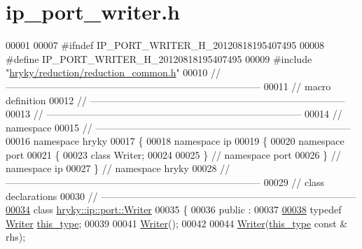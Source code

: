 \hypertarget{ip__port__writer_8h_source}{\section{ip\-\_\-port\-\_\-writer.\-h}
}

\begin{DoxyCode}
00001 
00007 \textcolor{preprocessor}{#ifndef IP\_PORT\_WRITER\_H\_20120818195407495}
00008 \textcolor{preprocessor}{}\textcolor{preprocessor}{#define IP\_PORT\_WRITER\_H\_20120818195407495}
00009 \textcolor{preprocessor}{}\textcolor{preprocessor}{#include "\hyperlink{reduction__common_8h}{hryky/reduction/reduction_common.h}"}
00010 \textcolor{comment}{//
      ------------------------------------------------------------------------------}
00011 \textcolor{comment}{// macro definition}
00012 \textcolor{comment}{//
      ------------------------------------------------------------------------------}
00013 \textcolor{comment}{//
      ------------------------------------------------------------------------------}
00014 \textcolor{comment}{// namespace}
00015 \textcolor{comment}{//
      ------------------------------------------------------------------------------}
00016 \textcolor{keyword}{namespace }hryky
00017 \{
00018 \textcolor{keyword}{namespace }ip
00019 \{
00020 \textcolor{keyword}{namespace }port
00021 \{
00023     \textcolor{keyword}{class }Writer;
00024 
00025 \} \textcolor{comment}{// namespace port}
00026 \} \textcolor{comment}{// namespace ip}
00027 \} \textcolor{comment}{// namespace hryky}
00028 \textcolor{comment}{//
      ------------------------------------------------------------------------------}
00029 \textcolor{comment}{// class declarations}
00030 \textcolor{comment}{//
      ------------------------------------------------------------------------------}
\hypertarget{ip__port__writer_8h_source_l00034}{}\hyperlink{classhryky_1_1ip_1_1port_1_1_writer}{00034} \textcolor{comment}{}\textcolor{keyword}{class }\hyperlink{classhryky_1_1ip_1_1port_1_1_writer}{hryky::ip::port::Writer}
00035 \{
00036 \textcolor{keyword}{public} :
00037 
\hypertarget{ip__port__writer_8h_source_l00038}{}\hyperlink{classhryky_1_1ip_1_1port_1_1_writer_ab3ca05b8279270920a83e984f5795ea2}{00038}     \textcolor{keyword}{typedef} \hyperlink{classhryky_1_1ip_1_1port_1_1_writer}{Writer} \hyperlink{classhryky_1_1ip_1_1port_1_1_writer_ab3ca05b8279270920a83e984f5795ea2}{this_type};
00039 
00041     \hyperlink{classhryky_1_1ip_1_1port_1_1_writer_a68bf73cfcb5d91b34d1948a428fff79d}{Writer}();
00042 
00044     \hyperlink{classhryky_1_1ip_1_1port_1_1_writer_a68bf73cfcb5d91b34d1948a428fff79d}{Writer}(\hyperlink{classhryky_1_1ip_1_1port_1_1_writer}{this_type} \textcolor{keyword}{const} & rhs);

\end{DoxyCode}

